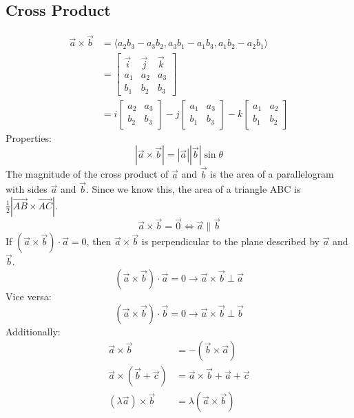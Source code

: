 \documentclass[letterpaper, 12pt]{math}
\begin{document}
\subsection*{Cross Product}
\begin{align*}
  \vec{a}\times\vec{b} &= \langle a_{2}b_{3}-a_{3}b_{2},a_{3}b_{1}-a_{1}b_{3},
  a_{1}b_{2}-a_{2}b_{1}\rangle \\
  &= \begin{bmatrix}
    \vec{i} & \vec{j} & \vec{k} \\
    a_{1} & a_{2} & a_{3} \\
    b_{1} & b_{2} & b_{3}
  \end{bmatrix} \\
  &= i\begin{bmatrix}
    a_{2} & a_{3} \\
    b_{2} & b_{3}
  \end{bmatrix}-j\begin{bmatrix}
    a_{1} & a_{3} \\
    b_{1} & b_{3}
  \end{bmatrix}-k\begin{bmatrix}
    a_{1} & a_{2} \\
    b_{1} & b_{2}
  \end{bmatrix}
\end{align*}
Properties:
\[ |\vec{a}\times\vec{b}| = |\vec{a}||\vec{b}|\sin\theta \]
The magnitude of the cross product of \( \vec{a} \) and \( \vec{b} \) is the
area of a parallelogram with sides \( \vec{a} \) and \( \vec{b} \). Since we
know this, the area of a triangle ABC is
\( \frac{1}{2}|\vec{AB}\times\vec{AC}| \).
\[ \vec{a}\times\vec{b} = \vec{0} \iff \vec{a}\parallel\vec{b} \]
If \( (\vec{a}\times\vec{b})\cdot\vec{a} = 0 \), then \( \vec{a}\times\vec{b} \)
is perpendicular to the plane described by \( \vec{a} \) and \( \vec{b} \).
\[ (\vec{a}\times\vec{b})\cdot\vec{a} =
  0 \to \vec{a}\times\vec{b}\ \bot\ \vec{a} \]
Vice versa:
\[ (\vec{a}\times\vec{b})\cdot\vec{b} =
  0 \to \vec{a}\times\vec{b}\ \bot\ \vec{b} \]
Additionally:
\begin{align*}
  \vec{a}\times\vec{b} &= -(\vec{b}\times\vec{a}) \\
  \vec{a}\times(\vec{b}+\vec{c}) &= \vec{a}\times\vec{b}+\vec{a}+\vec{c} \\
  (\lambda\vec{a})\times\vec{b} &= \lambda(\vec{a}\times\vec{b})
\end{align*}
\end{document}
